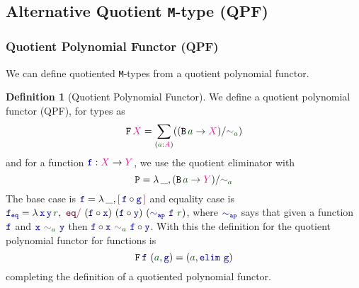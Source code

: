 \documentclass[xelatex,mathserif,serif,notheorems]{beamer} %
\theoremstyle{plain} %
\theoremstyle{definition}
\newtheorem{defn}[thm]{Definition}%
\theoremstyle{remark}
\newcommand*{\term}[1]{\textcolor{green!30!black}{#1}} %
\newcommand*{\type}[1]{\textcolor{magenta!90!black}{#1}}
\newcommand*{\relation}[1]{\textcolor{gray!75!black}{\ensuremath{\mathtt{#1}}}}
\newcommand*{\function}[1]{\textcolor{blue!60!black}{\ensuremath{\mathtt{#1}}}}
\newcommand*{\constructor}[1]{\textcolor{purple!60!black}{\ensuremath{\mathtt{#1}}}}
\newcommand*{\typeformer}[1]{\ensuremath{\mathtt{#1}}}
\newcommand*{\functor}[1]{\ensuremath{\mathbf{\mathtt{#1}}}}
\newcommand*{\quotientconstructor}[1]{\constructor{[}\,#1\,\constructor{]}}
\newcommand{\setlengths}{
  \setlength{\abovedisplayskip}{4pt}
  \setlength{\belowdisplayskip}{4pt}
  \setlength{\abovedisplayshortskip}{2pt}
  \setlength{\belowdisplayshortskip}{2pt}
}
\begin{document}
\subsection{Alternative Quotient \texttt{M}-type (QPF)}
\begin{frame}
  \frametitle{Quotient Polynomial Functor (QPF)}
  We can define quotiented \texttt{M}-types from a quotient polynomial functor.
  \begin{defn}[Quotient Polynomial Functor]\setlengths
    We define a quotient polynomial functor (QPF), for types as
    \begin{equation}
      \functor{F}\,\type{X} =  \sum_{(\term{a} : \type{A})} ((\typeformer{B}\,\term{a} \rightarrow \type{X}) / \relation{\sim}_{\term{a}})
    \end{equation}
    and for a function \(\function{f} : \type{X} \rightarrow \type{Y}\), we use the quotient eliminator with
    \begin{equation}
      \typeformer{P} = \lambda\,\_, (\typeformer{B}\,\term{a} \rightarrow \type{Y})/\relation{\sim}_{\term{a}}
    \end{equation}
    The base case is \(\function{f} = \lambda\,\_,\quotientconstructor{\function{f} \circ \function{g}}\) and equality case is \(\function{f_{eq}} = \lambda\,\function{x}\,\function{y}\,\term{r},~\constructor{eq/}~(\function{f} \circ \function{x})~(\function{f} \circ \function{y})~(\function{\sim_{ap}}~\function{f}~\term{r})\), where \(\function{\sim_{ap}}\) says that given a function \(\function{f}\) and \(\function{x}~\relation{\sim}_{\term{a}}~\function{y}\) then \(\function{f} \circ \function{x}~\relation{\sim}_{\term{a}}~\function{f} \circ \function{y}\). With this the definition for the quotient polynomial functor for functions is
    \begin{equation}
      \functor{F}\,\function{f}~(\term{a} , \function{g}) = (\term{a} , \function{elim}~\function{g})
    \end{equation}
    completing the definition of a quotiented polynomial functor.
  \end{defn}
\end{frame}
\end{document}
